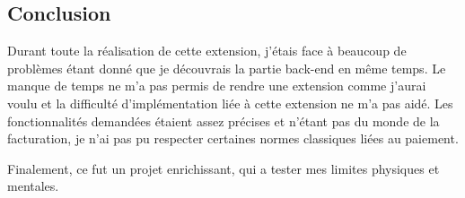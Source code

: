 \subsection{Conclusion}

\begin{flushleft}
Durant toute la réalisation de cette extension, j'étais face à beaucoup de problèmes étant donné que je découvrais la partie back-end en même temps. Le manque de temps ne m'a pas permis de rendre une extension comme j'aurai voulu et la difficulté d'implémentation liée à cette extension ne m'a pas aidé.
Les fonctionnalités demandées étaient assez précises et n'étant pas du monde de la facturation, je n'ai pas pu respecter certaines normes classiques liées au paiement.
\end{flushleft}

\begin{flushleft}
    Finalement, ce fut un projet enrichissant, qui a tester mes limites physiques et mentales.
\end{flushleft}
